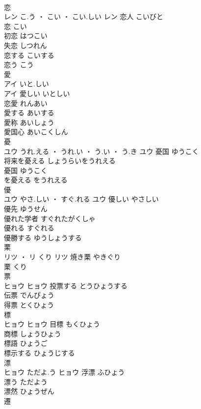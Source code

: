 \documentclass[8pt]{extreport}
\begin{document}
\begin{CJK}{UTF8}{min}
\\	恋	
\\	レン	こ.う ・ こい ・ こい.しい	レン	恋人	こいびと	
\\	恋	こい	
\\	初恋	はつこい	
\\	失恋	しつれん	
\\	恋する	こいする	
\\	恋う	こう	
\\	愛	
\\	アイ	いと.しい
\\	アイ	愛しい	いとしい	
\\	恋愛	れんあい	
\\	愛する	あいする	
\\	愛称	あいしょう	
\\	愛国心	あいこくしん	
\\	憂	
\\	ユウ	うれ.える ・ うれ.い ・ う.い ・ う.き	ユウ	憂国	ゆうこく	
\\	将来を憂える	しょうらいをうれえる	
\\	憂国	ゆうこく	
\\	を憂える	をうれえる	
\\	優	
\\	ユウ	やさ.しい ・ すぐ.れる	ユウ	優しい	やさしい	
\\	優先	ゆうせん	
\\	優れた学者	すぐれたがくしゃ	
\\	優れる	すぐれる	
\\	優勝する	ゆうしょうする	
\\	栗	
\\	リツ ・ リ	くり	リツ	焼き栗	やきぐり	
\\	栗	くり	
\\	票	
\\	ヒョウ		ヒョウ	投票する	とうひょうする	
\\	伝票	でんぴょう	
\\	得票	とくひょう	
\\	標	
\\	ヒョウ		ヒョウ													目標	もくひょう	
\\	商標	しょうひょう	
\\	標語	ひょうご	
\\	標示する	ひょうじする	
\\	漂	
\\	ヒョウ	ただよ.う	ヒョウ	浮漂	ふひょう	
\\	漂う	ただよう	
\\	漂然	ひょうぜん	
\\	遷	

\end{CJK}
\end{document}
